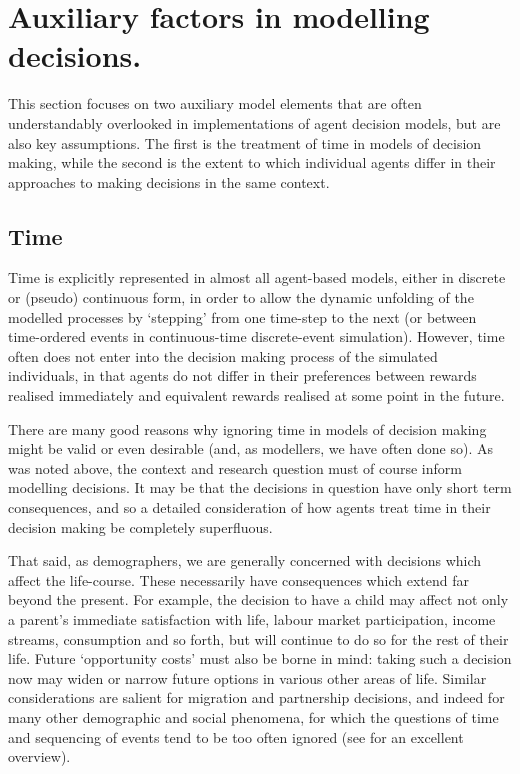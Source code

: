 \documentclass{article}
\begin{document}
\section{Auxiliary factors in modelling
decisions.}\label{auxiliary-factors-in-modelling-decisions}

This section focuses on two auxiliary model elements that are
often understandably overlooked in implementations of agent decision
models, but are also key assumptions. The first is the treatment of time
in models of decision making, while the second is the extent to which individual agents differ in their approaches to making decisions
in the same context.

\subsection{Time}\label{time}

Time is explicitly represented in almost all agent-based models, either
in discrete or (pseudo) continuous form, in order to allow the dynamic
unfolding of the modelled processes by `stepping' from one time-step to
the next (or between time-ordered events in continuous-time
discrete-event simulation). However, time often does not enter into the
decision making process of the simulated individuals, in that agents do
not differ in their preferences between rewards realised immediately and
equivalent rewards realised at some point in the future. 

There are many good reasons why ignoring time in models of decision
making might be valid or even desirable (and, as modellers, we have
often done so). As was noted above, the context and research question
must of course inform modelling decisions. It may be that the decisions
in question have only short term consequences, and so a detailed
consideration of how agents treat time in their decision making be
completely superfluous.

That said, as demographers, we are generally concerned with decisions
which affect the life-course. These necessarily have consequences which
extend far beyond the present. For example, the decision to have a child
may affect not only a parent's immediate satisfaction with life, labour
market participation, income streams, consumption and so forth, but will
continue to do so for the rest of their life. Future `opportunity costs'
must also be borne in mind: taking such a decision now may widen or
narrow future options in various other areas of life. Similar
considerations are salient for migration and partnership decisions, and indeed for many other demographic and social phenomena, for which the questions of time and sequencing of events tend to be too often ignored (see \citet{Abbott2001} for an excellent overview).
\end{document}
